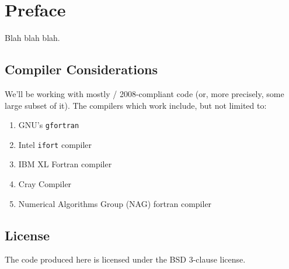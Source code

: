 \chapter{Preface}

Blah blah blah.

\section*{Compiler Considerations}

We'll be working with mostly \FORTRAN/ 2008-compliant code (or, more
precisely, some large subset of it). The compilers which work include,
but not limited to:
\begin{enumerate}
\item GNU's {\tt gfortran}
\item Intel {\tt ifort} compiler
\item IBM XL Fortran compiler
\item Cray Compiler
\item Numerical Algorithms Group (NAG) fortran compiler
\end{enumerate}

\section*{License}

The code produced here is licensed under the BSD 3-clause license.

\endinput
